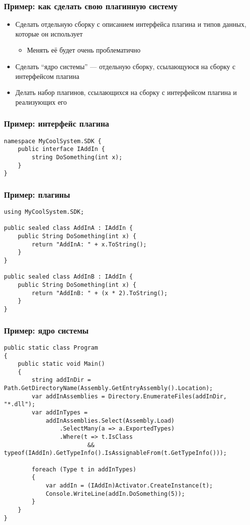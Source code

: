 \documentclass[xetex,mathserif,serif]{beamer}
\begin{document}
	\begin{frame}
		\frametitle{Пример: как сделать свою плагинную систему}
		\begin{itemize}
			\item Сделать отдельную сборку с описанием интерфейса плагина и типов данных, которые он использует
			\begin{itemize}
				\item Менять её будет очень проблематично
			\end{itemize}
			\item Сделать ``ядро системы'' --- отдельную сборку, ссылающуюся на сборку с интерфейсом плагина
			\item Делать набор плагинов, ссылающихся на сборку с интерфейсом плагина и реализующих его
		\end{itemize}
	\end{frame}

	\begin{frame}[fragile]
		\frametitle{Пример: интерфейс плагина}
		\begin{verbatim}
namespace MyCoolSystem.SDK {
    public interface IAddIn {
        string DoSomething(int x);
    }
}
		\end{verbatim}
	\end{frame}

	\begin{frame}[fragile]
		\frametitle{Пример: плагины}
		\begin{verbatim}
using MyCoolSystem.SDK;

public sealed class AddInA : IAddIn {
    public String DoSomething(int x) {
        return "AddInA: " + x.ToString();
    }
}

public sealed class AddInB : IAddIn {
    public String DoSomething(int x) {
        return "AddInB: " + (x * 2).ToString();
    }
}
		\end{verbatim}
	\end{frame}

	\begin{frame}[fragile]
		\frametitle{Пример: ядро системы}
		\begin{scriptsize}
			\begin{verbatim}
public static class Program
{
    public static void Main()
    {
        string addInDir = Path.GetDirectoryName(Assembly.GetEntryAssembly().Location);
        var addInAssemblies = Directory.EnumerateFiles(addInDir, "*.dll");
        var addInTypes =
            addInAssemblies.Select(Assembly.Load)
                .SelectMany(a => a.ExportedTypes)
                .Where(t => t.IsClass 
                        && typeof(IAddIn).GetTypeInfo().IsAssignableFrom(t.GetTypeInfo()));

        foreach (Type t in addInTypes)
        {
            var addIn = (IAddIn)Activator.CreateInstance(t);
            Console.WriteLine(addIn.DoSomething(5));
        }
    }
}
			\end{verbatim}
		\end{scriptsize}
	\end{frame}
\end{document}
